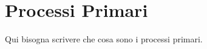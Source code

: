 \section{Processi Primari}
\label{sec:processi_primari}

Qui bisogna scrivere che cosa sono i processi primari.




